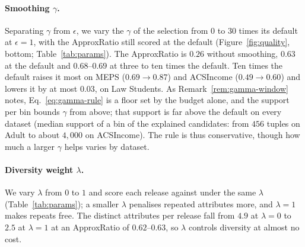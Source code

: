\paragraph{Smoothing $\gamma$.}
Separating $\gamma$ from $\epsilon$, we vary the $\gamma$ of the selection from $0$ to $30$ times its default at $\epsilon=1$, with the ApproxRatio still scored at the default (Figure~\ref{fig:quality}, bottom; Table~\ref{tab:params}).
The ApproxRatio is $0.26$ without smoothing, $0.63$ at the default and $0.68$--$0.69$ at three to ten times the default.
Ten times the default raises it most on MEPS ($0.69\rightarrow0.87$) and ACSIncome ($0.49\rightarrow0.60$) and lowers it by at most $0.03$, on Law Students.
As Remark~\ref{rem:gamma-window} notes, Eq.~\eqref{eq:gamma-rule} is a floor set by the budget alone, and the support per bin bounds $\gamma$ from above; that support is far above the default on every dataset (median support of a bin of the explained candidates: from $456$ tuples on Adult to about $4{,}000$ on ACSIncome).
The rule is thus conservative, though how much a larger $\gamma$ helps varies by dataset.

\paragraph{Diversity weight $\lambda$.}
We vary $\lambda$ from $0$ to $1$ and score each release against \BF{} under the same $\lambda$ (Table~\ref{tab:params}); a smaller $\lambda$ penalises repeated attributes more, and $\lambda=1$ makes repeats free.
The distinct attributes per release fall from $4.9$ at $\lambda=0$ to $2.5$ at $\lambda=1$ at an ApproxRatio of $0.62$--$0.63$, so $\lambda$ controls diversity at almost no cost.


